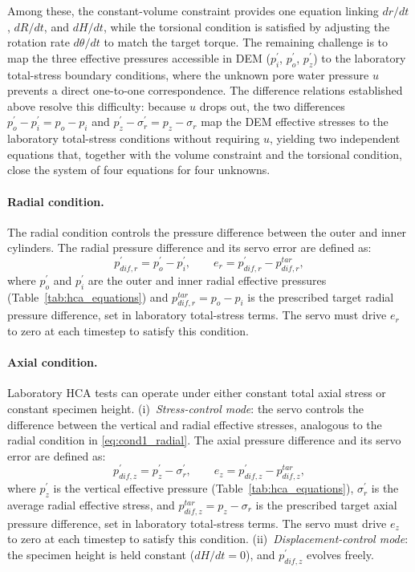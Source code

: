 \documentclass[a4paper,fleqn]{cas-sc}
\begin{document}
Among these, the constant-volume constraint provides one equation linking $dr/dt$, $dR/dt$, and $dH/dt$, while the torsional condition is satisfied by adjusting the rotation rate $d\theta/dt$ to match the target torque. The remaining challenge is to map the three effective pressures accessible in DEM ($p_i^{\prime}$, $p_o^{\prime}$, $p_z^{\prime}$) to the laboratory total-stress boundary conditions, where the unknown pore water pressure $u$ prevents a direct one-to-one correspondence. The difference relations established above resolve this difficulty: because $u$ drops out, the two differences $p_o^{\prime}-p_i^{\prime}=p_o-p_i$ and $p_z^{\prime}-\sigma_r^{\prime}=p_z-\sigma_r$ map the DEM effective stresses to the laboratory total-stress conditions without requiring $u$, yielding two independent equations that, together with the volume constraint and the torsional condition, close the system of four equations for four unknowns.

\paragraph{Radial condition.}
The radial condition controls the pressure difference between the outer and inner cylinders. The radial pressure difference and its servo error are defined as:
\begin{equation}
p_{dif,r}^{\prime} = p_o^{\prime} - p_i^{\prime}, \qquad e_r = p_{dif,r}^{\prime} - p_{dif,r}^{tar},
\label{eq:cond1_radial}
\end{equation}
where $p_o^{\prime}$ and $p_i^{\prime}$ are the outer and inner radial effective pressures (Table~\ref{tab:hca_equations}) and $p_{dif,r}^{tar}=p_o-p_i$ is the prescribed target radial pressure difference, set in laboratory total-stress terms. The servo must drive $e_r$ to zero at each timestep to satisfy this condition.

\paragraph{Axial condition.}
Laboratory HCA tests can operate under either constant total axial stress or constant specimen height.
(i)~\emph{Stress-control mode}: the servo controls the difference between the vertical and radial effective stresses, analogous to the radial condition in \cref{eq:cond1_radial}. The axial pressure difference and its servo error are defined as:
\begin{equation}
p_{dif,z}^{\prime} = p_z^{\prime} - \sigma_r^{\prime}, \qquad e_z = p_{dif,z}^{\prime} - p_{dif,z}^{tar},
\label{eq:cond2_axial}
\end{equation}
where $p_z^{\prime}$ is the vertical effective pressure (Table~\ref{tab:hca_equations}), $\sigma_r^{\prime}$ is the average radial effective stress, and $p_{dif,z}^{tar}=p_z-\sigma_r$ is the prescribed target axial pressure difference, set in laboratory total-stress terms. The servo must drive $e_z$ to zero at each timestep to satisfy this condition.
(ii)~\emph{Displacement-control mode}: the specimen height is held constant ($dH/dt=0$), and $p_{dif,z}^{\prime}$ evolves freely.
\end{document}
